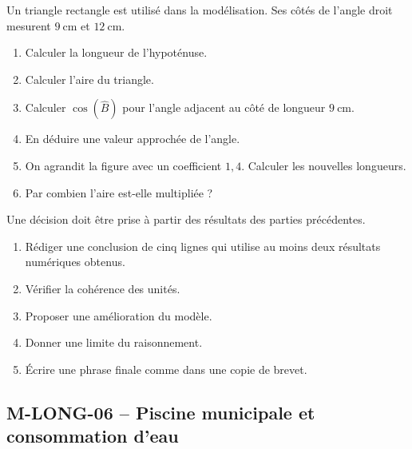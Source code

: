 \documentclass[11pt,a4paper]{article}
\newcounter{exercice}
\begin{document}
\begin{exercice}
Un triangle rectangle est utilisé dans la modélisation. Ses côtés de l'angle droit mesurent $9\ \mathrm{cm}$ et $12\ \mathrm{cm}$.
\begin{enumerate}
  \item Calculer la longueur de l'hypoténuse.
  \item Calculer l'aire du triangle.
  \item Calculer $\cos(\widehat{B})$ pour l'angle adjacent au côté de longueur $9\ \mathrm{cm}$.
  \item En déduire une valeur approchée de l'angle.
  \item On agrandit la figure avec un coefficient $1{,}4$. Calculer les nouvelles longueurs.
  \item Par combien l'aire est-elle multipliée ?
\end{enumerate}
\end{exercice}

\begin{exercice}
Une décision doit être prise à partir des résultats des parties précédentes.
\begin{enumerate}
  \item Rédiger une conclusion de cinq lignes qui utilise au moins deux résultats numériques obtenus.
  \item Vérifier la cohérence des unités.
  \item Proposer une amélioration du modèle.
  \item Donner une limite du raisonnement.
  \item Écrire une phrase finale comme dans une copie de brevet.
\end{enumerate}
\end{exercice}
\newpage
\subsection{M-LONG-06 -- Piscine municipale et consommation d'eau}
\end{document}
